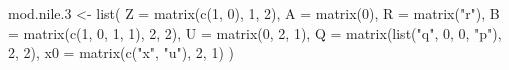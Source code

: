 \begin{Schunk}
\begin{Sinput}
 mod.nile.3 <- list(
   Z = matrix(c(1, 0), 1, 2), A = matrix(0), R = matrix("r"),
   B = matrix(c(1, 0, 1, 1), 2, 2), U = matrix(0, 2, 1),
   Q = matrix(list("q", 0, 0, "p"), 2, 2),
   x0 = matrix(c("x", "u"), 2, 1)
 )
\end{Sinput}
\end{Schunk}
